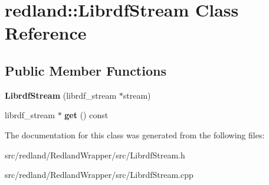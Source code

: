 \hypertarget{classredland_1_1LibrdfStream}{}\section{redland\+:\+:Librdf\+Stream Class Reference}
\label{classredland_1_1LibrdfStream}
\subsection*{Public Member Functions}
\begin{DoxyCompactItemize}
\item 
\mbox{\label{classredland_1_1LibrdfStream_aaa64a7ef8a26be8cf35f3b31d6e34a1b}} 
{\bfseries Librdf\+Stream} (librdf\+\_\+stream $\ast$stream)
\item 
\mbox{\label{classredland_1_1LibrdfStream_a5b52659abdfc01e583e1b9941eec2c4b}} 
librdf\+\_\+stream $\ast$ {\bfseries get} () const
\end{DoxyCompactItemize}


The documentation for this class was generated from the following files\+:\begin{DoxyCompactItemize}
\item 
src/redland/\+Redland\+Wrapper/src/Librdf\+Stream.\+h\item 
src/redland/\+Redland\+Wrapper/src/Librdf\+Stream.\+cpp\end{DoxyCompactItemize}
